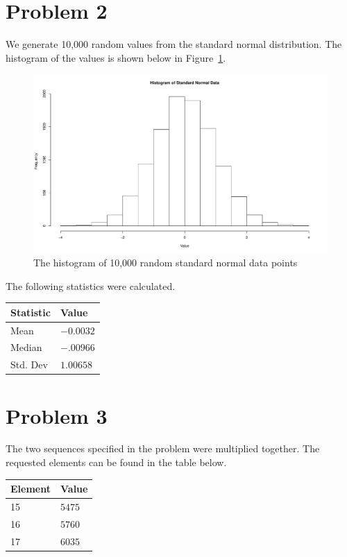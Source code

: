 \documentclass{amsart}
\begin{document}
\section{Problem 2}
We generate 10,000 random values from the standard normal
distribution. The histogram of the values is shown below in Figure~\ref{fig:p2a}.
\begin{figure}
  \centering
  \includegraphics[width=\linewidth]{problem2_histogram.pdf}
  \caption{The histogram of 10,000 random standard normal data points}
  \label{fig:p2a}
\end{figure}

The following statistics were calculated.
\begin{table}[ht]
\centering
\begin{tabular}{ll}
  \hline
Statistic & Value \\
  \hline
Mean & $-0.0032$ \\
Median & $-.00966$ \\
Std. Dev & $1.00658$ \\
   \hline
\end{tabular}
\end{table}

\section{Problem 3}
The two sequences specified in the problem were multiplied together.
The requested elements can be found in the table below.

\begin{table}[ht]
\centering
\begin{tabular}{ll}
  \hline
Element & Value \\
  \hline
15 & $5475$ \\
16 & $5760$ \\
17 & $6035$ \\
   \hline
\end{tabular}
\end{table}
\end{document}
